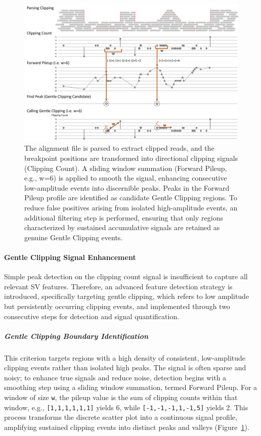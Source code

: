 \documentclass[pdflatex,sn-nature]{sn-jnl}
\def\pandocbounded#1{%
  \begingroup
  \setkeys{Gin}{width=1.0\linewidth,height=1.0\textheight,keepaspectratio}%
  #1%
  \endgroup
}
\begin{document}
\begin{figure}
\centering
\pandocbounded{\includegraphics[keepaspectratio]{page_14_cropped.jpg}}
\caption[Clipping Breakpoint Detection and Gentle Clipping Identification]{The alignment file is parsed to extract clipped reads, and the breakpoint positions are transformed into directional clipping signals (Clipping Count). A sliding window summation (Forward Pileup, e.g., w=6) is applied to smooth the signal, enhancing consecutive low-amplitude events into discernible peaks. Peaks in the Forward Pileup profile are identified as candidate Gentle Clipping regions. To reduce false positives arising from isolated high-amplitude events, an additional filtering step is performed, ensuring that only regions characterized by sustained accumulative signals are retained as genuine Gentle Clipping events.
}\label{fig:met-page-14-cropped-jpg}
\end{figure}

\paragraph{Gentle Clipping Signal Enhancement}\label{gentle-clipping-signal-enhancement}

Simple peak detection on the clipping count signal is insufficient to capture all relevant SV features. Therefore, an advanced feature detection strategy is introduced, specifically targeting gentle clipping, which refers to low amplitude but persistently occurring clipping events, and implemented through two consecutive steps for detection and signal quantification.

\subparagraph{Gentle Clipping Boundary Identification}

This criterion targets regions with a high density of consistent, low-amplitude clipping events rather than isolated high peaks. The signal is often sparse and noisy; to enhance true signals and reduce noise, detection begins with a smoothing step using a sliding window summation, termed Forward Pileup. For a window of size \texttt{w}, the pileup value is the sum of clipping counts within that window, e.g., \texttt{[1,1,1,1,1,1]} yields 6, while \texttt{[-1,-1,-1,1,-1,5]} yields 2. This process transforms the discrete scatter plot into a continuous signal profile, amplifying sustained clipping events into distinct peaks and valleys (Figure~\ref{fig:met-page-14-cropped-jpg}).
\end{document}
